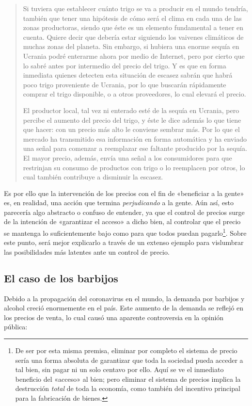 \documentclass[12pt,a4paper,twoside]{book}
\begin{document}
\begin{quotation}
Si tuviera que establecer cuánto trigo se va a producir en el mundo tendría, también que tener una hipótesis de cómo será el clima en cada una de las zonas productoras, siendo que éste es un elemento fundamental a tener en cuenta. Quiere decir que debería estar siguiendo los vaivenes climáticos de muchas zonas del planeta. Sin embargo, si hubiera una enorme sequía en Ucrania podré enterarme ahora por medio de Internet, pero por cierto que lo sabré antes por intermedio del precio del trigo. Y es que en forma inmediata quienes detecten esta situación de escasez sabrán que habrá poco trigo proveniente de Ucrania, por lo que buscarán rápidamente comprar el trigo disponible, o a otros proveedores, lo cual elevará el precio.

El productor local, tal vez ni enterado esté de la sequía en Ucrania, pero percibe el aumento del precio del trigo, y éste le dice además lo que tiene que hacer: con un precio más alto le conviene sembrar más. Por lo que el mercado ha transmitido esa información en forma automática y ha enviado una señal para comenzar a reemplazar ese faltante producido por la sequía. El mayor precio, además, envía una señal a los consumidores para que restrinjan su consumo de productos con trigo o lo reemplacen por otros, lo cual también contribuye a disminuir la escasez. \cite[pág. 104]{elementos-econopol}
\end{quotation}

Es por ello que la intervención de los precios con el fin de «beneficiar a la gente» es, en realidad, una acción que termina \textit{perjudicando} a la gente. Aún así, esto parecería algo abstracto o confuso de entender, ya que el control de precios surge de la intención de «garantizar el acceso» a dicho bien, al controlar que el precio se mantenga lo suficientemente bajo como para que todos puedan pagarlo\footnote{De ser por esta misma premisa, eliminar por completo el sistema de precio sería una forma absoluta de garantizar que toda la sociedad pueda acceder a tal bien, sin pagar ni un solo centavo por ello. Aquí se ve el inmediato beneficio del «acceso» al bien; pero eliminar el sistema de precios implica la destrucción \textit{total} de toda la economía, como también del incentivo principal para la fabricación de bienes.}. Sobre este punto, será mejor explicarlo a través de un extenso ejemplo para vislumbrar las posibilidades más latentes ante un control de precio.

\subsection{El caso de los barbijos}
Debido a la propagación del coronavirus en el mundo, la demanda por barbijos y alcohol creció enormemente en el país. Este aumento de la demanda se reflejó en los precios de venta, lo cual causó una aparente controversia en la opinión pública:
\end{document}
